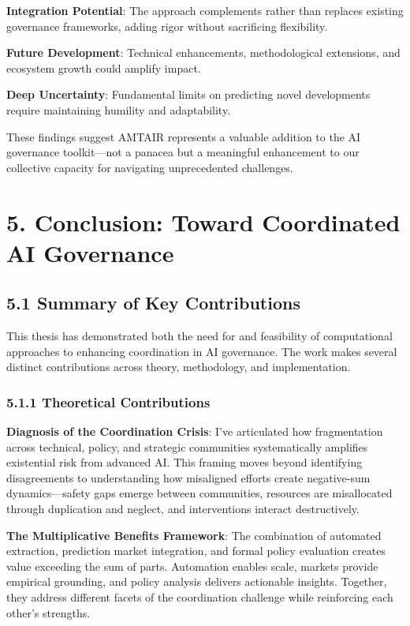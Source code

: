\documentclass[
  11pt,
  letterpaper,
  openany]{book}
\begin{document}
\textbf{Integration Potential}: The approach complements rather than
replaces existing governance frameworks, adding rigor without
sacrificing flexibility.

\textbf{Future Development}: Technical enhancements, methodological
extensions, and ecosystem growth could amplify impact.

\textbf{Deep Uncertainty}: Fundamental limits on predicting novel
developments require maintaining humility and adaptability.

These findings suggest AMTAIR represents a valuable addition to the AI
governance toolkit---not a panacea but a meaningful enhancement to our
collective capacity for navigating unprecedented challenges.


\chapter{5. Conclusion: Toward Coordinated AI
Governance}\label{sec-conclusion}

\section{5.1 Summary of Key Contributions}\label{sec-key-contributions}

This thesis has demonstrated both the need for and feasibility of
computational approaches to enhancing coordination in AI governance. The
work makes several distinct contributions across theory, methodology,
and implementation.

\subsection{5.1.1 Theoretical
Contributions}\label{sec-theoretical-contributions}

\textbf{Diagnosis of the Coordination Crisis}: I've articulated how
fragmentation across technical, policy, and strategic communities
systematically amplifies existential risk from advanced AI. This framing
moves beyond identifying disagreements to understanding how misaligned
efforts create negative-sum dynamics---safety gaps emerge between
communities, resources are misallocated through duplication and neglect,
and interventions interact destructively.

\textbf{The Multiplicative Benefits Framework}: The combination of
automated extraction, prediction market integration, and formal policy
evaluation creates value exceeding the sum of parts. Automation enables
scale, markets provide empirical grounding, and policy analysis delivers
actionable insights. Together, they address different facets of the
coordination challenge while reinforcing each other's strengths.
\end{document}
